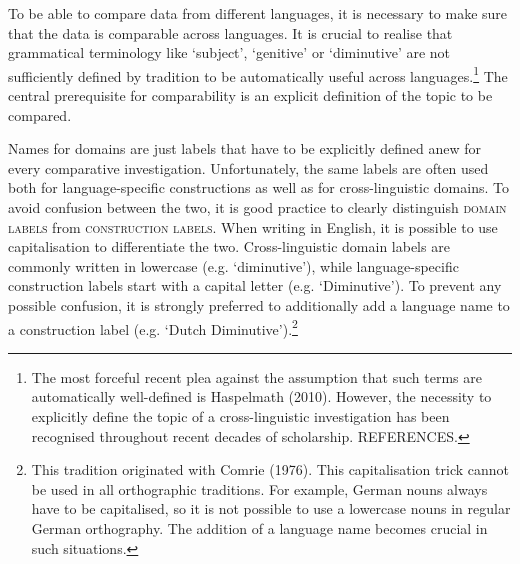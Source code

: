 \label{ch:languagecomparison}

To be able to compare data from different languages, it is necessary to make sure that the data is comparable across languages. It is crucial to realise that grammatical terminology like `subject', `genitive' or `diminutive' are not sufficiently defined by tradition to be automatically useful across languages.\footnote{The most forceful recent plea against the assumption that such terms are automatically well-defined is Haspelmath (2010). However, the necessity to explicitly define the topic of a cross-linguistic investigation has been recognised throughout recent decades of scholarship. REFERENCES.} The central prerequisite for comparability is an explicit definition of the topic to be compared.

%
Names for domains are just labels that have to be explicitly defined anew for every comparative investigation. Unfortunately, the same labels are often used both for language-specific constructions as well as for cross-linguistic domains. To avoid confusion between the two, it is good practice to clearly distinguish \textsc{domain labels} from \textsc{construction labels}. When writing in English, it is possible to use capitalisation to differentiate the two. Cross-linguistic domain labels are commonly written in lowercase (e.g. `diminutive'), while language-specific construction labels start with a capital letter (e.g. `Diminutive'). To prevent any possible confusion, it is strongly preferred to additionally add a language name to a construction label (e.g. `Dutch Diminutive').\footnote{This tradition originated with Comrie (1976). This capitalisation trick cannot be used in all orthographic traditions. For example, German nouns always have to be capitalised, so it is not possible to use a lowercase nouns in regular German orthography. The addition of a language name becomes crucial in such situations.}

